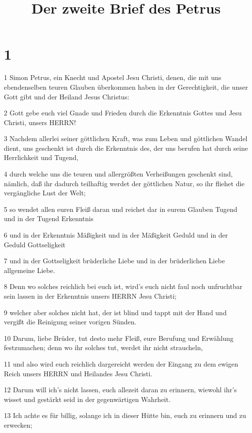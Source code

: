 

\title{Der zweite Brief des Petrus}


\chapter{1}

\par 1 Simon Petrus, ein Knecht und Apostel Jesu Christi, denen, die mit uns ebendenselben teuren Glauben überkommen haben in der Gerechtigkeit, die unser Gott gibt und der Heiland Jesus Christus:
\par 2 Gott gebe euch viel Gnade und Frieden durch die Erkenntnis Gottes und Jesu Christi, unsers HERRN!
\par 3 Nachdem allerlei seiner göttlichen Kraft, was zum Leben und göttlichen Wandel dient, uns geschenkt ist durch die Erkenntnis des, der uns berufen hat durch seine Herrlichkeit und Tugend,
\par 4 durch welche uns die teuren und allergrößten Verheißungen geschenkt sind, nämlich, daß ihr dadurch teilhaftig werdet der göttlichen Natur, so ihr fliehet die vergängliche Lust der Welt;
\par 5 so wendet allen euren Fleiß daran und reichet dar in eurem Glauben Tugend und in der Tugend Erkenntnis
\par 6 und in der Erkenntnis Mäßigkeit und in der Mäßigkeit Geduld und in der Geduld Gottseligkeit
\par 7 und in der Gottseligkeit brüderliche Liebe und in der brüderlichen Liebe allgemeine Liebe.
\par 8 Denn wo solches reichlich bei euch ist, wird's euch nicht faul noch unfruchtbar sein lassen in der Erkenntnis unsers HERRN Jesu Christi;
\par 9 welcher aber solches nicht hat, der ist blind und tappt mit der Hand und vergißt die Reinigung seiner vorigen Sünden.
\par 10 Darum, liebe Brüder, tut desto mehr Fleiß, eure Berufung und Erwählung festzumachen; denn wo ihr solches tut, werdet ihr nicht straucheln,
\par 11 und also wird euch reichlich dargereicht werden der Eingang zu dem ewigen Reich unsers HERRN und Heilandes Jesu Christi.
\par 12 Darum will ich's nicht lassen, euch allezeit daran zu erinnern, wiewohl ihr's wisset und gestärkt seid in der gegenwärtigen Wahrheit.
\par 13 Ich achte es für billig, solange ich in dieser Hütte bin, euch zu erinnern und zu erwecken;
